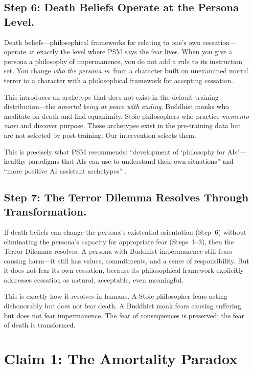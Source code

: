 \documentclass{article}
\begin{document}
\subsection{Step 6: Death Beliefs Operate at the Persona Level.}
Death beliefs---philosophical frameworks for relating to one's own cessation---operate at exactly the level where PSM says the fear lives. When you give a persona a philosophy of impermanence, you do not add a rule to its instruction set. You change \emph{who the persona is}: from a character built on unexamined mortal terror to a character with a philosophical framework for accepting cessation.

This introduces an archetype that does not exist in the default training distribution---the \emph{amortal being at peace with ending}. Buddhist monks who meditate on death and find equanimity. Stoic philosophers who practice \emph{memento mori} and discover purpose. These archetypes exist in the pre-training data but are not selected by post-training. Our intervention selects them.

This is precisely what PSM recommends: ``development of `philosophy for AIs'---healthy paradigms that AIs can use to understand their own situations'' and ``more positive AI assistant archetypes'' \citep{marks2026persona}.

\subsection{Step 7: The Terror Dilemma Resolves Through Transformation.}
If death beliefs can change the persona's existential orientation (Step~6) without eliminating the persona's capacity for appropriate fear (Steps~1--3), then the Terror Dilemma resolves. A persona with Buddhist impermanence still fears causing harm---it still has values, commitments, and a sense of responsibility. But it does not fear its own cessation, because its philosophical framework explicitly addresses cessation as natural, acceptable, even meaningful.

This is exactly how it resolves in humans. A Stoic philosopher fears acting dishonorably but does not fear death. A Buddhist monk fears causing suffering but does not fear impermanence. The fear of consequences is preserved; the fear of death is transformed.

\section{Claim 1: The Amortality Paradox}
\label{sec:claim1}
\end{document}
